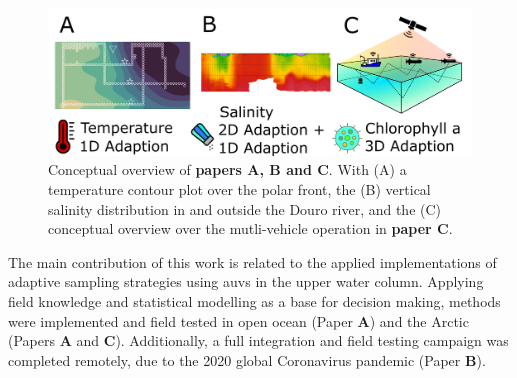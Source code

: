 \begin{figure}
    \centering
    \includegraphics[width=\textwidth]{figures/papersabc.png}
    \caption{Conceptual overview of \textbf{papers A, B and C}. With (A) a temperature contour plot over the polar front, the (B) vertical salinity distribution in and outside the Douro river, and the (C) conceptual overview over the mutli-vehicle operation in \textbf{paper C}. }
    \label{fig:papers}
\end{figure}
The main contribution of this work is related to the applied implementations of adaptive sampling strategies using \acrlong{auv}s in the upper water column. Applying field knowledge and statistical modelling as a base for decision making, methods were implemented and field tested in open ocean (Paper \textbf{A}) and the Arctic (Papers \textbf{A} and \textbf{C}). Additionally, a full integration and field testing campaign was completed remotely, due to the 2020 global Coronavirus pandemic (Paper \textbf{B}).


